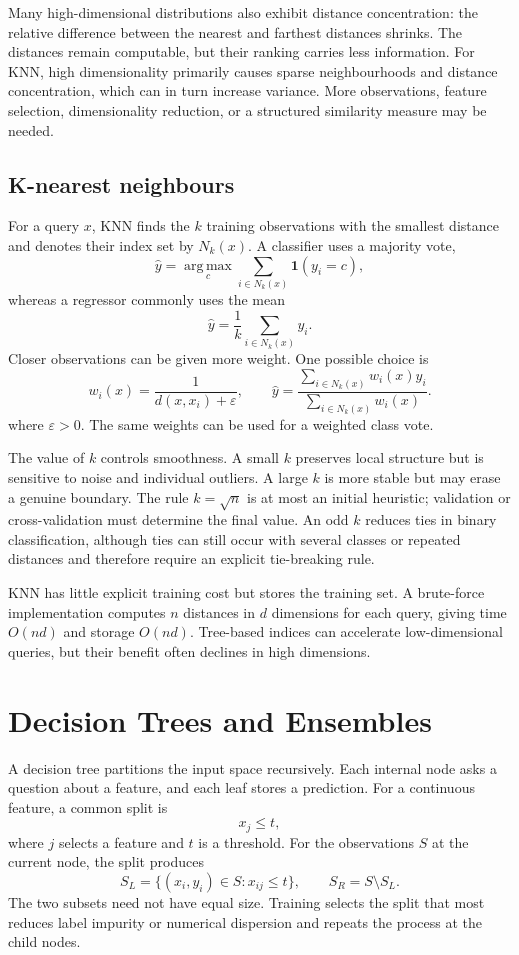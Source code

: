 Many high-dimensional distributions also exhibit distance concentration: the
relative difference between the nearest and farthest distances shrinks. The
distances remain computable, but their ranking carries less information. For
KNN, high dimensionality primarily causes sparse neighbourhoods and distance
concentration, which can in turn increase variance. More observations, feature
selection, dimensionality reduction, or a structured similarity measure may be
needed.

\subsection{K-nearest neighbours}

For a query $x$, KNN finds the $k$ training observations with the smallest
distance and denotes their index set by $N_k(x)$. A classifier uses a majority
vote,
\[
\hat y
=\operatorname*{arg\,max}_{c}
\sum_{i\in N_k(x)}\mathbf 1(y_i=c),
\]
whereas a regressor commonly uses the mean
\[
\hat y=\frac{1}{k}\sum_{i\in N_k(x)}y_i.
\]
Closer observations can be given more weight. One possible choice is
\[
w_i(x)=\frac{1}{d(x,x_i)+\varepsilon},
\qquad
\hat y
=\frac{\sum_{i\in N_k(x)}w_i(x)y_i}
{\sum_{i\in N_k(x)}w_i(x)}.
\]
where $\varepsilon>0$. The same weights can be used for a weighted class vote.

\KnnGeometryFigure

The value of $k$ controls smoothness. A small $k$ preserves local structure but
is sensitive to noise and individual outliers. A large $k$ is more stable but
may erase a genuine boundary. The rule $k=\sqrt n$ is at most an initial
heuristic; validation or cross-validation must determine the final value. An
odd $k$ reduces ties in binary classification, although ties can still occur
with several classes or repeated distances and therefore require an explicit
tie-breaking rule.

KNN has little explicit training cost but stores the training set. A brute-force
implementation computes $n$ distances in $d$ dimensions for each query, giving
time $O(nd)$ and storage $O(nd)$. Tree-based indices can accelerate low-dimensional
queries, but their benefit often declines in high dimensions.


\section{Decision Trees and Ensembles}

A decision tree partitions the input space recursively. Each internal node asks
a question about a feature, and each leaf stores a prediction. For a continuous
feature, a common split is
\[
x_j\le t,
\]
where $j$ selects a feature and $t$ is a threshold. For the observations $S$ at
the current node, the split produces
\[
S_L=\{(x_i,y_i)\in S:x_{ij}\le t\},
\qquad
S_R=S\setminus S_L.
\]
The two subsets need not have equal size. Training selects the split that most
reduces label impurity or numerical dispersion and repeats the process at the
child nodes.

